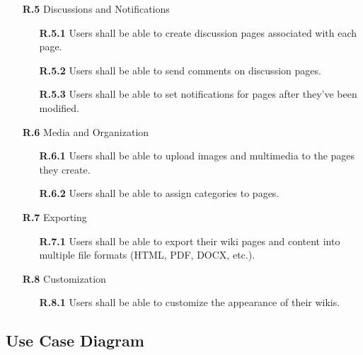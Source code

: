 \documentclass{article}
\begin{document}
\begin{itemize}
    \item[\textbf{R.5}] Discussions and Notifications
    \begin{itemize}
        \item[\textbf{R.5.1}] Users shall be able to create discussion pages associated with each page.
        \item[\textbf{R.5.2}] Users shall be able to send comments on discussion pages.
        \item[\textbf{R.5.3}] Users shall be able to set notifications for pages after they've been modified.
    \end{itemize}
    
    \item[\textbf{R.6}] Media and Organization
    \begin{itemize}
        \item[\textbf{R.6.1}] Users shall be able to upload images and multimedia to the pages they create.
        \item[\textbf{R.6.2}] Users shall be able to assign categories to pages.
    \end{itemize}
    
    \item[\textbf{R.7}] Exporting
    \begin{itemize}
        \item[\textbf{R.7.1}] Users shall be able to export their wiki pages and content into multiple file formats (HTML, PDF, DOCX, etc.).
    \end{itemize}
    
    \item[\textbf{R.8}] Customization
    \begin{itemize}
        \item[\textbf{R.8.1}] Users shall be able to customize the appearance of their wikis.
    \end{itemize}
\end{itemize}

\subsection{Use Case Diagram}
\end{document}
